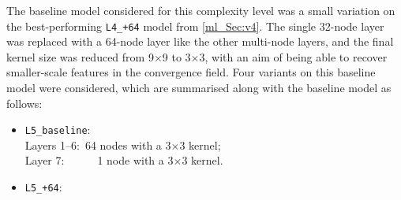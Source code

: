 The baseline model considered for this complexity level was a small variation on the best-performing \texttt{L4\_+64} model from \autoref{ml_Sec:v4}. The single 32-node layer was replaced with a 64-node layer like the other multi-node layers, and the final kernel size was reduced from 9$\times$9 to 3$\times$3, with an aim of being able to recover smaller-scale features in the convergence field. Four variants on this baseline model were considered, which are summarised along with the baseline model as follows:
\begin{itemize}
\item \texttt{L5\_baseline}: \\
\hspace*{1em}Layers 1--6:~64 nodes with a 3$\times$3 kernel; \\
\hspace*{1em}Layer 7:~~~~~~1 node with a 3$\times$3 kernel.
\item \texttt{L5\_+64}: \\

\end{itemize}
